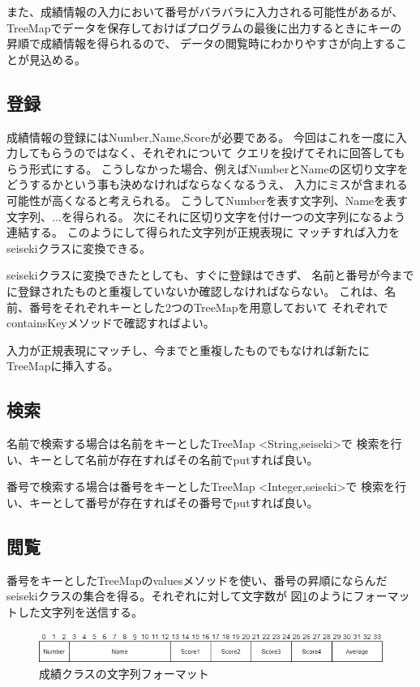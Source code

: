 \documentclass[dvipdfmx]{jsarticle}
\begin{document}
また、成績情報の入力において番号がバラバラに入力される可能性があるが、
TreeMapでデータを保存しておけばプログラムの最後に出力するときにキーの
昇順で成績情報を得られるので、
データの閲覧時にわかりやすさが向上することが見込める。

\subsection{登録}
成績情報の登録にはNumber,Name,Scoreが必要である。
今回はこれを一度に入力してもらうのではなく、それぞれについて
クエリを投げてそれに回答してもらう形式にする。
こうしなかった場合、例えばNumberとNameの区切り文字を
どうするかという事も決めなければならなくなるうえ、
入力にミスが含まれる可能性が高くなると考えられる。
こうしてNumberを表す文字列、Nameを表す文字列、...を得られる。
次にそれに区切り文字を付け一つの文字列になるよう連結する。
このようにして得られた文字列が正規表現に
マッチすれば入力をseisekiクラスに変換できる。

seisekiクラスに変換できたとしても、すぐに登録はできず、
名前と番号が今までに登録されたものと重複していないか確認しなければならない。
これは、名前、番号をそれぞれキーとした2つのTreeMapを用意しておいて
それぞれでcontainsKeyメソッドで確認すればよい。

入力が正規表現にマッチし、今までと重複したものでもなければ新たに
TreeMapに挿入する。

\subsection{検索}
名前で検索する場合は名前をキーとしたTreeMap \textless String,seiseki\textgreater で
検索を行い、キーとして名前が存在すればその名前でputすれば良い。

番号で検索する場合は番号をキーとしたTreeMap \textless Integer,seiseki\textgreater で
検索を行い、キーとして番号が存在すればその番号でputすれば良い。

\subsection{閲覧}
番号をキーとしたTreeMapのvaluesメソッドを使い、番号の昇順にならんだ
seisekiクラスの集合を得る。それぞれに対して文字数が
図\ref{seiseki_format}のようにフォーマットした文字列を送信する。
\begin{figure}[H]
  \centering
  \includegraphics[width=0.9\hsize]{../pic/seiseki_format.png}
  \caption{成績クラスの文字列フォーマット}
  \label{seiseki_format}
\end{figure}
\end{document}
